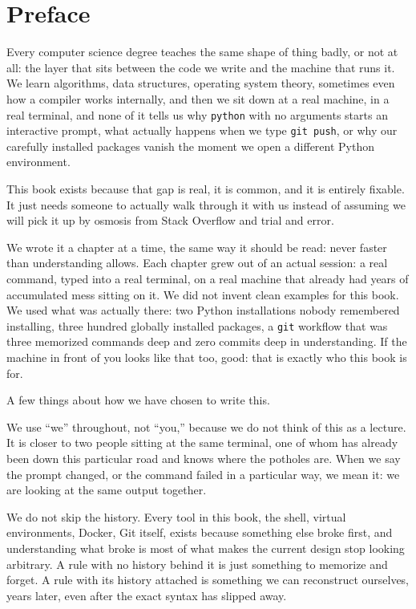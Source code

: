 \chapter*{Preface}

Every computer science degree teaches the same shape of thing badly, or not at all: the
layer that sits between the code we write and the machine that runs it. We learn
algorithms, data structures, operating system theory, sometimes even how a compiler works
internally, and then we sit down at a real machine, in a real terminal, and none of it
tells us why \texttt{python} with no arguments starts an interactive prompt, what actually
happens when we type \texttt{git push}, or why our carefully installed packages vanish the
moment we open a different Python environment.

This book exists because that gap is real, it is common, and it is entirely fixable. It
just needs someone to actually walk through it with us instead of assuming we will pick it
up by osmosis from Stack Overflow and trial and error.

We wrote it a chapter at a time, the same way it should be read: never faster than
understanding allows. Each chapter grew out of an actual session: a real command, typed
into a real terminal, on a real machine that already had years of accumulated mess sitting
on it. We did not invent clean examples for this book. We used what was actually there:
two Python installations nobody remembered installing, three hundred globally installed
packages, a \texttt{git} workflow that was three memorized commands deep and zero commits
deep in understanding. If the machine in front of you looks like that too, good: that is
exactly who this book is for.

A few things about how we have chosen to write this.

We use ``we'' throughout, not ``you,'' because we do not think of this as a lecture. It is
closer to two people sitting at the same terminal, one of whom has already been down this
particular road and knows where the potholes are. When we say the prompt changed, or the
command failed in a particular way, we mean it: we are looking at the same output
together.

We do not skip the history. Every tool in this book, the shell, virtual environments,
Docker, Git itself, exists because something else broke first, and understanding what
broke is most of what makes the current design stop looking arbitrary. A rule with no
history behind it is just something to memorize and forget. A rule with its history
attached is something we can reconstruct ourselves, years later, even after the exact
syntax has slipped away.

